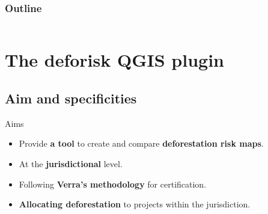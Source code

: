\documentclass[10pt,table,dvipsnames,compress]{beamer}
\newif\ifplacelogo %
\begin{document}

\placelogotrue
\begin{frame}
  \frametitle{Outline}
  \begin{columns}[c]
    \begin{column}{0.5\textwidth}
      \tableofcontents[sections=1]
      \vspace{0.5cm}
      \tableofcontents[sections=2]
      \vspace{0.5cm}
      \tableofcontents[sections=3]
    \end{column}
    \begin{column}{0.5\textwidth}
        \tableofcontents[sections=4]
        \vspace{0.5cm}
        \tableofcontents[sections=5]
    \end{column}
  \end{columns}
\end{frame}
\placelogofalse

\section{The deforisk QGIS plugin}
\label{sec:org33875a8}

\subsection{Aim and specificities}
\label{sec:org2b48526}

\begin{frame}[label={sec:org9b9dfa0}]{Aims}
\begin{itemize}
\item Provide \textbf{a tool} to create and compare \textbf{deforestation risk maps}.
\item At the \textbf{jurisdictional} level.
\item Following \textbf{Verra's methodology} for certification.
\item \textbf{Allocating deforestation} to projects within the jurisdiction.
\end{itemize}
\end{frame}
\end{document}
